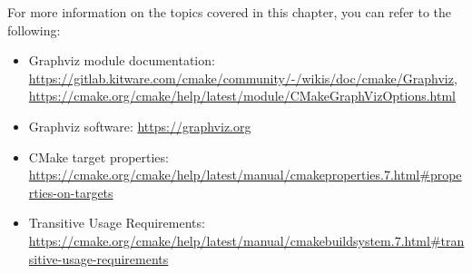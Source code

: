 For more information on the topics covered in this chapter, you can refer to the following:

\begin{itemize}
\item
Graphviz module documentation: \url{https://gitlab.kitware.com/cmake/community/-/wikis/doc/cmake/Graphviz}, \url{https://cmake.org/cmake/help/latest/module/CMakeGraphVizOptions.html}

\item
Graphviz software: \url{https://graphviz.org}

\item
CMake target properties: \url{https://cmake.org/cmake/help/latest/manual/cmakeproperties.7.html#properties-on-targets}

\item
Transitive Usage Requirements: \url{https://cmake.org/cmake/help/latest/manual/cmakebuildsystem.7.html#transitive-usage-requirements}
\end{itemize}





















